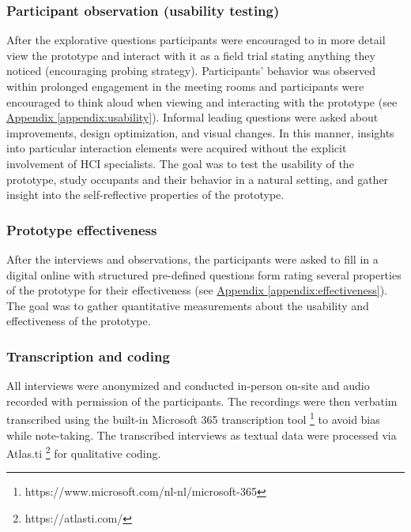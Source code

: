 \subsubsection{Participant observation (usability testing)}

After the explorative questions participants were encouraged to in more detail view the prototype and interact with it as a field trial stating anything they noticed (encouraging probing strategy). Participants' behavior was observed within prolonged engagement in the meeting rooms and participants were encouraged to think aloud when viewing and interacting with the prototype (see \hyperref[appendix:usability]{Appendix \ref*{appendix:usability}}). Informal leading questions were asked about improvements, design optimization, and visual changes. In this manner, insights into particular interaction elements were acquired without the explicit involvement of HCI specialists. The goal was to test the usability of the prototype, study occupants and their behavior in a natural setting, and gather insight into the self-reflective properties of the prototype. 

\subsubsection{Prototype effectiveness}

After the interviews and observations, the participants were asked to fill in a digital online with structured pre-defined questions form rating several properties of the prototype for their effectiveness (see \hyperref[appendix:effectiveness]{Appendix \ref*{appendix:effectiveness}}). The goal was to gather quantitative measurements about the usability and effectiveness of the prototype.

\subsubsection{Transcription and coding}
All interviews were anonymized and conducted in-person on-site and audio recorded with permission of the participants. The recordings were then verbatim transcribed using the built-in Microsoft 365 transcription tool \footnote{https://www.microsoft.com/nl-nl/microsoft-365} to avoid bias while note-taking. The transcribed interviews as textual data were processed via Atlas.ti \footnote{https://atlasti.com/} for qualitative coding.

